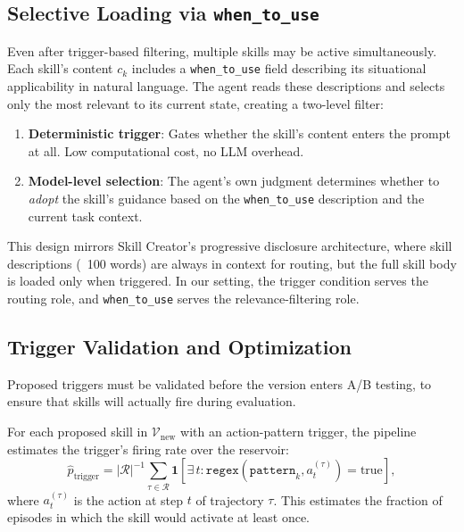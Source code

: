 \documentclass{article}
\theoremstyle{plain}
\theoremstyle{definition}
\theoremstyle{remark}
\begin{document}
\subsection{Selective Loading via \texttt{when\_to\_use}}

Even after trigger-based filtering, multiple skills may be active simultaneously. Each skill's content $c_k$ includes a \texttt{when\_to\_use} field describing its situational applicability in natural language. The agent reads these descriptions and selects only the most relevant to its current state, creating a two-level filter:

\begin{enumerate}[itemsep=2pt]
    \item \textbf{Deterministic trigger}: Gates whether the skill's content enters the prompt at all. Low computational cost, no LLM overhead.
    \item \textbf{Model-level selection}: The agent's own judgment determines whether to \textit{adopt} the skill's guidance based on the \texttt{when\_to\_use} description and the current task context.
\end{enumerate}

This design mirrors Skill Creator's progressive disclosure architecture, where skill descriptions (~100 words) are always in context for routing, but the full skill body is loaded only when triggered. In our setting, the trigger condition serves the routing role, and \texttt{when\_to\_use} serves the relevance-filtering role.

\subsection{Trigger Validation and Optimization}

Proposed triggers must be validated before the version enters A/B testing, to ensure that skills will actually fire during evaluation.

For each proposed skill in $\mathcal{V}_{\text{new}}$ with an action-pattern trigger, the pipeline estimates the trigger's firing rate over the reservoir:
\begin{equation}
    \hat{p}_{\text{trigger}} = |\mathcal{R}|^{-1} \sum_{\tau \in \mathcal{R}} \mathbf{1}\!\left[\exists\, t : \texttt{regex}(\texttt{pattern}_k, a_t^{(\tau)}) = \text{true}\right],
\end{equation}
where $a_t^{(\tau)}$ is the action at step $t$ of trajectory $\tau$. This estimates the fraction of episodes in which the skill would activate at least once.
\end{document}

